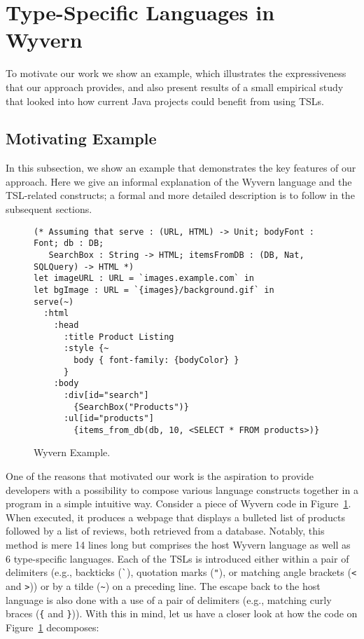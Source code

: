 
\section{Type-Specific Languages in Wyvern}
\label{s:motivation}

To motivate our work we show an example, which illustrates the expressiveness that our approach provides, and also present results of a small empirical study that looked into how current Java projects could  benefit from using TSLs.

\subsection{Motivating Example}

In this subsection, we show an example that demonstrates the key features of our approach. Here we give an informal explanation of the Wyvern language and the TSL-related constructs; a formal and more detailed description is to follow in the subsequent sections.


\begin{figure}[t]
\begin{lstlisting}
(* Assuming that serve : (URL, HTML) -> Unit; bodyFont : Font; db : DB; 
   SearchBox : String -> HTML; itemsFromDB : (DB, Nat, SQLQuery) -> HTML *)
let imageURL : URL = `images.example.com` in
let bgImage : URL = `{images}/background.gif` in
serve(~)
  :html
    :head
      :title Product Listing
      :style {~
        body { font-family: {bodyColor} }
      }
    :body
      :div[id="search"]
        {SearchBox("Products")}
      :ul[id="products"]
        {items_from_db(db, 10, <SELECT * FROM products>)}
\end{lstlisting}
\caption{Wyvern Example.}
\label{f-example}
\end{figure}


One of the reasons that motivated our work is the aspiration to provide developers with a possibility to compose various language constructs together in a program in a simple intuitive way. Consider a piece of Wyvern code in Figure~\ref{f-example}. When executed, it produces a webpage that displays a bulleted list of products followed by a list of reviews, both retrieved from a database. Notably, this method is mere 14 lines long but comprises the host Wyvern language as well as 6 type-specific languages. Each of the TSLs is introduced either within a pair of delimiters (e.g., backticks (\lstinline{`}), quotation marks (\lstinline{"}), or matching angle brackets (\lstinline{<} and \lstinline{>})) or by a tilde (\lstinline{~}) on a preceding line. The escape back to the host language is also done with a use of a pair of delimiters (e.g., matching curly braces (\lstinline|{| and \lstinline|}|)). With this in mind, let us have a closer look at how the code on Figure~\ref{f-example} decomposes:

